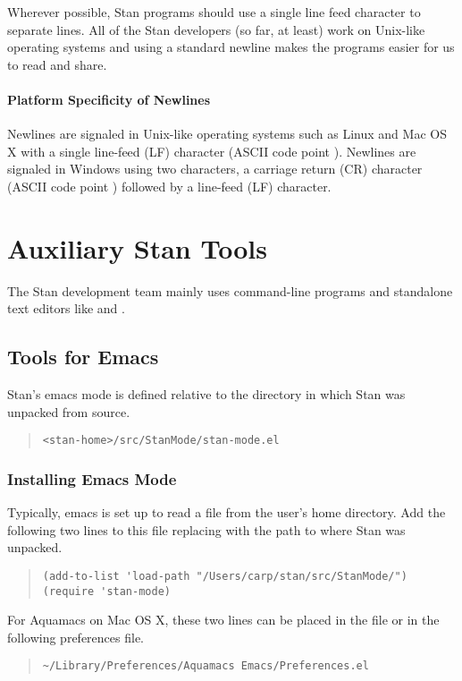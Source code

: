 Wherever possible, Stan programs should use a single line feed 
character to separate lines.  All of the Stan developers (so far, at 
least) work on Unix-like operating systems and using a standard 
newline makes the programs easier for us to read and share.  

\subsubsection{Platform Specificity of Newlines}

Newlines are signaled in Unix-like operating systems such as Linux and
Mac OS X with a single line-feed (LF) character (ASCII code point
).  Newlines are signaled in Windows using two characters,
a carriage return (CR) character (ASCII code point )
followed by a line-feed (LF) character.


\chapter{Auxiliary Stan Tools}

The Stan development team mainly uses command-line programs and
standalone text editors like  and .   

\section{Tools for Emacs}

Stan's emacs mode is defined relative to the directory
 in which Stan was unpacked from source.
%
\begin{quote}
\nolinkurl{<stan-home>/src/StanMode/stan-mode.el}
\end{quote}
%

\subsection{Installing Emacs Mode}

Typically, emacs is set up to read a  file from the
user's home directory.  Add the following two lines to this file
replacing  with the path to where Stan was unpacked.
\begin{quote}
\begin{Verbatim}
(add-to-list 'load-path "/Users/carp/stan/src/StanMode/")
(require 'stan-mode)
\end{Verbatim}
\end{quote}

For Aquamacs on Mac OS X, these two lines can be placed in the
 file or in the following preferences file.
%
\begin{quote}
\nolinkurl{~/Library/Preferences/Aquamacs Emacs/Preferences.el}
\end{quote}





